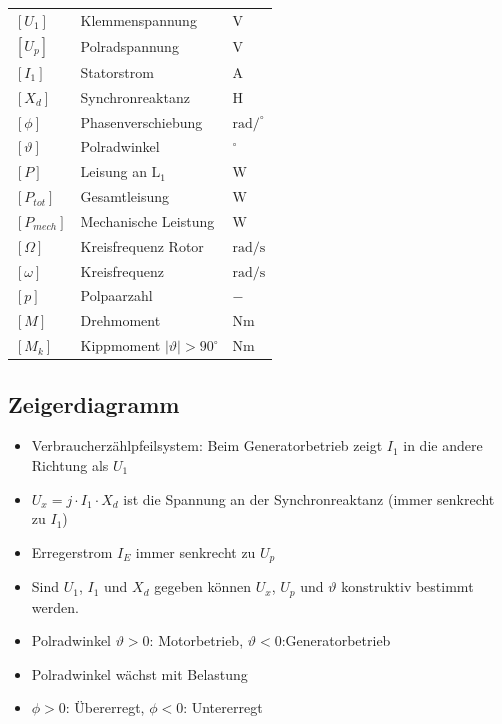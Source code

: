 \begin{minipage}[c]{0.55\columnwidth}
    \begin{tabular}{@{} l p{3.2cm} l @{}}
        $[U_1]$      & Klemmenspannung \dotfill & $\text{V}$ \\
        $[U_p]$      & Polradspannung \dotfill & $\mathrm{V}$ \\
        $[I_1]$ & Statorstrom \dotfill& $\mathrm{A}$ \\
        $[X_d]$  & Synchronreaktanz \dotfill& $\mathrm{H}$\\
        $[\phi]$  & Phasenverschiebung \dotfill& $\mathrm{rad/^\circ}$\\
        $[\vartheta]$  & Polradwinkel \dotfill& $\mathrm{^\circ}$\\
        $[P]$  & Leisung an $\mathrm{L_1}$ \dotfill& $\mathrm{W}$\\
        $[P_{tot}]$  & Gesamtleisung \dotfill& $\mathrm{W}$\\
        $[P_{mech}]$  & Mechanische Leistung \dotfill& $\mathrm{W}$\\
        $[\Omega]$  & Kreisfrequenz Rotor \dotfill& $\mathrm{rad/s}$\\
        $[\omega]$  & Kreisfrequenz \dotfill& $\mathrm{rad/s}$\\
        $[p]$  & Polpaarzahl \dotfill& $-$\\
        $[M]$  & Drehmoment \dotfill& $\mathrm{Nm}$\\
        $[M_k]$  & Kippmoment $|\vartheta| > 90^\circ$ \dotfill& $\mathrm{Nm}$\\
    \end{tabular}
\end{minipage}

\subsection{Zeigerdiagramm}
\begin{minipage}[t]{0.49\columnwidth}
    \begin{itemize}
        \item Verbraucherzählpfeilsystem: Beim Generatorbetrieb zeigt $I_1$ in die andere Richtung als $U_1$
        \item $U_x = j\cdot I_1\cdot X_d$ ist die Spannung an der Synchronreaktanz (immer senkrecht zu $I_1$)
        \item Erregerstrom $I_E$ immer senkrecht zu $U_p$
    \end{itemize}
\end{minipage}
\hfill
\begin{minipage}[t]{0.49\columnwidth}
    \begin{itemize}
        \item Sind $U_1$, $I_1$ und $X_d$ gegeben können $U_x$, $U_p$ und $\vartheta$ konstruktiv bestimmt werden.
        \item Polradwinkel $\vartheta>0$: Motorbetrieb, $\vartheta<0$:Generatorbetrieb
        \item Polradwinkel wächst mit Belastung
        \item $\phi>0$: Übererregt, $\phi<0$: Untererregt
    \end{itemize}
    \vfill
\end{minipage}

